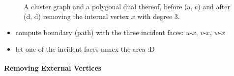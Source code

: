 \begin{figure}[H]
	\centering
	\quad
	\qquad
	\quad
	\caption{A cluster graph and a polygonal dual thereof, before (a, c) and after (d, d) removing the internal vertex $x$ with degree 3.}
	\label{fig:remove-vertex-example-internal}
\end{figure}

\begin{itemize}
	\item compute boundary (path) with the three incident faces: $u$-$x$, $v$-$x$, $w$-$x$
	\item let one of the incident faces annex the area :D
\end{itemize}

\lipsum



\paragraph{Removing External Vertices}


